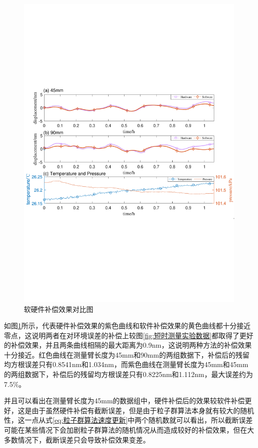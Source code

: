 \begin{figure}[htb]
  \centering
  \includegraphics[width=14cm]{fig/6-fig/软硬件补偿效果对比.pdf}
  \caption{软硬件补偿效果对比图}
  \label{fig:软硬件补偿效果对比图}
\end{figure}
如图\ref{fig:软硬件补偿效果对比图}所示，代表硬件补偿效果的紫色曲线和软件补偿效果的黄色曲线都十分接近零点，这说明两者在对环境误差的补偿上较图\ref{fig:短时测量实验数据}都取得了更好的补偿效果，并且两条曲线相隔的最大距离为0.9nm，这说明两种方法的补偿效果十分接近。红色曲线在测量臂长度为45mm和90mm的两组数据下，补偿后的残留均方根误差只有0.8541nm和1.034nm，而紫色曲线在测量臂长度为45mm和45mm的两组数据下，补偿后的残留均方根误差只有0.8225nm和1.112nm，最大误差约为7.5$\%$。

并且可以看出在测量臂长度为45mm的数据组中，硬件补偿后的效果较软件补偿更好，这是由于虽然硬件补偿有截断误差，但是由于粒子群算法本身就有较大的随机性，这一点从式\eqref{eq:粒子群算法速度更新}中两个随机数就可以看出，所以截断误差可能在某些情况下会加剧粒子群算法的随机情况从而造成较好的补偿效果，但在大多数情况下，截断误差只会导致补偿效果变差。

